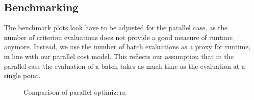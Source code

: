\subsection{Benchmarking}\label{subsec:parallelization::benchmarking}

The benchmark plots look have to be adjusted for the parallel case, as the number of criterion
evaluations does not provide a good measure of runtime anymore. Instead, we use the number of batch
evaluations as a proxy for runtime, in line with our parallel cost model. This reflects our
assumption that in the parallel case the evaluation of a batch takes as much time as the evaluation
at a single point.


\begin{figure}\label{fig:benchmark_parallel}
    \caption{Comparison of parallel optimizers.}
\end{figure}
